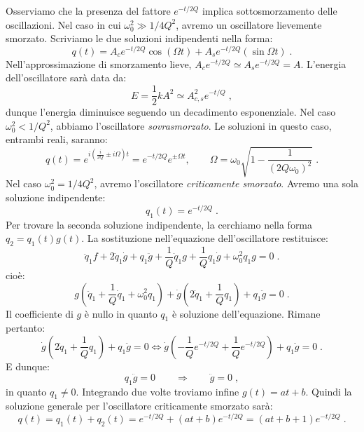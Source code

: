 Osserviamo che la presenza del fattore $e^{-t/2Q}$ implica sottosmorzamento delle oscillazioni. Nel caso in cui $\omega_0^2\gg 1/4Q^2$, avremo un oscillatore lievemente smorzato. Scriviamo le due soluzioni indipendenti nella forma:
\begin{equation}
q(t)=A_ce^{-t/2Q}\cos(\Omega t)+A_se^{-t/2Q}(\sin\Omega t)\;.
\end{equation}
Nell'approssimazione di smorzamento lieve, $A_ce^{-t/2Q}\simeq A_se^{-t/2Q} = A$. L'energia dell'oscillatore sarà data da:
\begin{equation}
E=\frac{1}{2}kA^2\simeq A_{c,s}^2e^{-t/Q}\;,
\end{equation}
dunque l'energia diminuisce seguendo un decadimento esponenziale. Nel caso $\omega_0^2<1/Q^2$, abbiamo l'oscillatore \textit{sovrasmorzato}. Le soluzioni in questo caso, entrambi reali, saranno:
\begin{equation}
q(t)=e^{i\left(\frac{i}{2Q}\pm i\Omega\right)t}=e^{-t/2Q}e^{\pm\Omega t}, \qquad \Omega=\omega_0\sqrt{1-\frac{1}{(2Q\omega_0)^2}}\;.
\end{equation}
Nel caso $\omega_0^2=1/4Q^2$, avremo l'oscillatore \textit{criticamente smorzato}. Avremo una sola soluzione indipendente:
\begin{equation}
q_1(t)=e^{-t/2Q}\;.
\end{equation}
Per trovare la seconda soluzione indipendente, la cerchiamo nella forma $q_2=q_1(t)g(t)$. La sostituzione nell'equazione dell'oscillatore restituisce:
\begin{equation}
\ddot{q}_1f+2\dot{q}_1\dot{g}+q_1\ddot{g}+\frac{1}{Q}\dot{q}_1g+\frac{1}{Q}q_1\dot{g}+\omega_0^2q_1g=0\;.
\end{equation}
cioè:
\begin{equation}
g\left(\ddot{q}_1+\frac{1}{Q}\dot{q}_1+\omega_0^2q_1\right)+\dot{g}\left(2\dot{q}_1+\frac{1}{Q}q_1\right)+q_1\ddot{g}=0\;.
\end{equation}
Il coefficiente di $g$ è nullo in quanto $q_1$ è soluzione dell'equazione. Rimane pertanto:
\begin{equation}
\dot{g}\left(2\dot{q}_1+\frac{1}{Q}q_1\right)+q_1\ddot{g}=0 \Longleftrightarrow \dot{g}\left(-\frac{1}{Q}e^{-t/2Q}+\frac{1}{Q}e^{-t/2Q}\right)+q_1\ddot{g}=0\;.
\end{equation}
E dunque:
\begin{equation}
q_1\ddot{g}=0\qquad  \Longrightarrow \qquad \ddot{g}=0\;,
\end{equation}
in quanto $q_1\ne 0$. Integrando due volte troviamo infine $g(t)=at+b$. Quindi la soluzione generale per l'oscillatore criticamente smorzato sarà:
\begin{equation}
q(t)=q_1(t)+q_2(t)=e^{-t/2Q}+(at+b)e^{-t/2Q}=(at+b+1)e^{-t/2Q}\;.
\end{equation}
